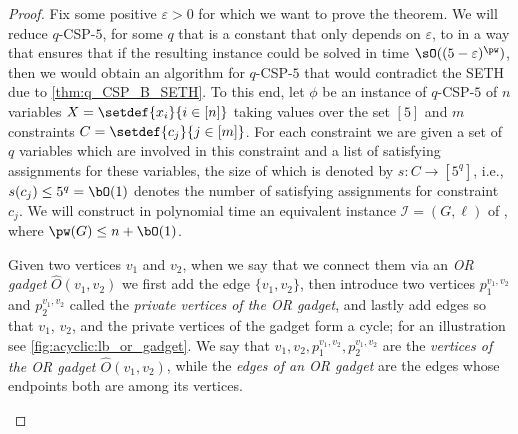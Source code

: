\begin{proof}

    Fix some positive $\varepsilon > 0$ for which we want to prove the theorem.
    We will reduce $q$-CSP-$5$, for some $q$ that is a constant that only depends on $\varepsilon$,
    to {\AcyclicM} in a way that ensures that if the resulting {\AcyclicM} instance could be solved in time $\sO((5-\varepsilon)^{\pw})$,
    then we would obtain an algorithm for $q$-CSP-$5$ that would contradict the SETH due to \cref{thm:q_CSP_B_SETH}.
    To this end, let $\phi$ be an instance of $q$-CSP-$5$ of $n$ variables $X = \setdef{x_i}{i \in [n]}$ taking values over the set $[5]$
    and $m$ constraints $C = \setdef{c_j}{j \in [m]}$.
    For each constraint we are given a set of $q$ variables which are involved in this constraint and a list of satisfying assignments for these variables,
    the size of which is denoted by $s \colon C \rightarrow [5^q]$,
    i.e., $s(c_j) \leq 5^q = \bO(1)$ denotes the number of satisfying assignments for constraint $c_j$.
    We will construct in polynomial time an equivalent instance $\mathcal{I} = (G,\ell)$ of \AcyclicM,
    where $\pw(G) \leq n + \bO (1)$.

    Given two vertices $v_1$ and $v_2$, when we say that we connect them via an \emph{OR gadget} $\hat{O}(v_1,v_2)$
    we first add the edge $\{v_1,v_2\}$,
    then introduce two vertices $p^{v_1,v_2}_1$ and $p^{v_1,v_2}_2$ called the \emph{private vertices of the OR gadget},
    and lastly add edges so that $v_1$, $v_2$, and the private vertices of the gadget form a cycle;
    for an illustration see \cref{fig:acyclic:lb_or_gadget}.
    We say that $v_1,v_2,p^{v_1,v_2}_1,p^{v_1,v_2}_2$ are the \emph{vertices of the OR gadget $\hat{O}(v_1,v_2)$},
    while the \emph{edges of an OR gadget} are the edges whose endpoints both are among its vertices.

    \begin{figure}[htb]
        \centering
\end{figure}
\end{proof}
